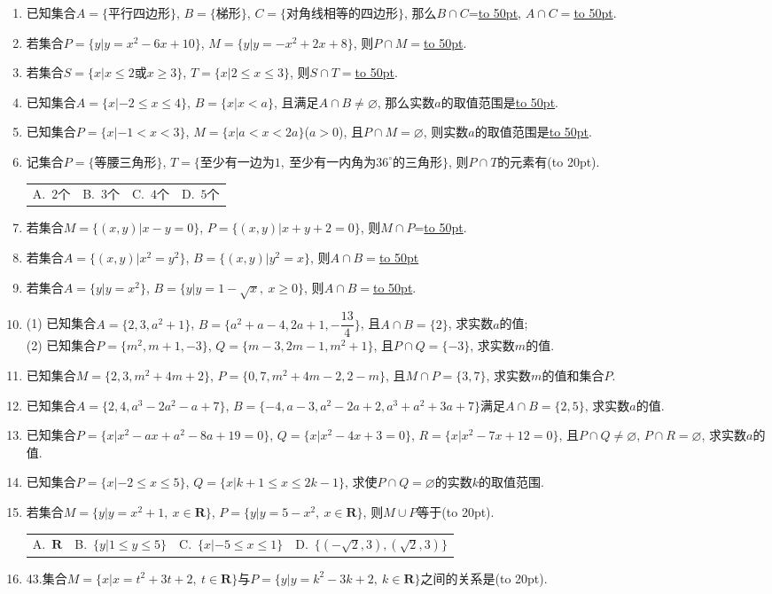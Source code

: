 \documentclass[10pt,a4paper]{article}
\newcommand{\blank}[1]{\underline{\hbox to #1pt{}}}
\newcommand{\bracket}[1]{(\hbox to #1pt{})}
\newcommand{\fourch}[4]{\par\begin{tabular}{p{.23\textwidth}p{.23\textwidth}p{.23\textwidth}p{.23\textwidth}}
A.~#1 &B.~#2& C.~#3& D.~#4
\end{tabular}}
\begin{document}
\begin{enumerate}[1.]
\fourch{$P\subset S$}{$P\subseteq S$}{$P=S$}{$P\supset S$}
\item 已知集合$A=\{\text{平行四边形}\}$, $B=\{\text{梯形}\}$, $C=\{\text{对角线相等的四边形}\}$, 那么$B\cap C$=\blank{50}, $A\cap C=$\blank{50}.
\item 若集合$P=\{y|y=x^2-6x+10\}$, $M=\{y|y=-x^2+2x+8\}$, 则$P\cap M=$\blank{50}.
\item 若集合$S=\{x|x\le 2\text{或}x\ge 3\}$, $T=\{x|2\le x\le 3\}$, 则$S\cap T=$\blank{50}.
\item 已知集合$A=\{x|-2\le x\le 4\}$, $B=\{x|x<a\}$, 且满足$A\cap B\ne \varnothing$, 那么实数$a$的取值范围是\blank{50}.
\item 已知集合$P=\{x|-1<x<3\}$, $M=\{x|a<x<2a\}$($a>0$), 且$P\cap M=\varnothing$, 则实数$a$的取值范围是\blank{50}.
\item 记集合$P=\{\text{等腰三角形}\}$, $T=\{\text{至少有一边为}1, \ \text{至少有一内角为}36^\circ\text{的三角形}\}$, 则$P\cap T$的元素有\bracket{20}.
\fourch{$2$个}{$3$个}{$4$个}{$5$个}
\item 若集合$M=\{(x,y)|x-y=0\}$, $P=\{(x,y)|x+y+2=0\}$, 则$M\cap P$=\blank{50}.
\item 若集合$A=\{(x,y)|x^2=y^2\}$, $B=\{(x,y)|y^2=x\}$, 则$A\cap B=$\blank{50}
\item 若集合$A=\{y|y =x^2\}$, $B=\{y|y=1-\sqrt x, \ x\ge 0\}$, 则$A\cap B=$\blank{50}.
\item (1) 已知集合$A=\{2,3,a^2+1\}$, $B=\{a^2+a-4,2a+1,-\dfrac{13}4\}$, 且$A\cap B=\{2\}$, 求实数$a$的值;\\
(2) 已知集合$P=\{m^2,m+1,-3\}$, $Q=\{m-3,2m-1,m^2+1\}$, 且$P\cap Q=\{-3\}$, 求实数$m$的值.
\item 已知集合$M=\{2,3,m^2+4m+2\}$, $P=\{0,7,m^2+4m-2,2-m\}$, 且$M\cap P=\{3,7\}$, 求实数$m$的值和集合$P$.
\item 已知集合$A=\{2,4,a^3-2a^2-a+7\}$, $B=\{-4,a-3,a^2-2a+2,a^3+a^2+3a+7\}$满足$A\cap B=\{2,5\}$, 求实数$a$的值.
\item 已知集合$P=\{x|x^2-ax+a^2-8a+19=0\}$, $Q=\{x|x^2-4x+3=0\}$, $R=\{x|x^2-7x+12=0\}$, 且$P\cap Q\ne \varnothing$, $P\cap R=\varnothing$, 求实数$a$的值.
\item 已知集合$P=\{x|-2\le x\le 5\}$, $Q=\{x|k+1\le x\le 2k-1\}$, 求使$P\cap Q=\varnothing$的实数$k$的取值范围.
\item 若集合$M=\{y|y=x^2+1, \ x\in \mathbf{R}\}$, $P=\{y|y=5-x^2, \ x\in \mathbf{R}\}$, 则$M\cup P$等于\bracket{20}.
\fourch{$\mathbf{R}$}{$\{y|1\le y\le 5\}$}{$\{x|-5\le x\le 1\}$}{$\{(-\sqrt 2,3),(\sqrt 2,3)\}$}
\item 43.集合$M=\{x |x=t^2+3t+2,\ t\in \mathbf{R}\}$与$P=\{y |y=k^2-3k+2,\ k\in \mathbf{R}\}$之间的关系是\bracket{20}.

\end{enumerate}
\end{document}
